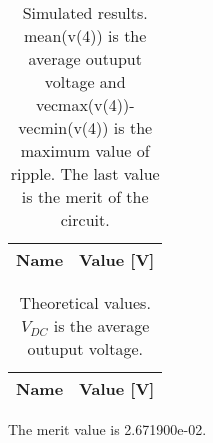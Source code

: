 \begin{table}[h]
  \centering
  \begin{tabular}{|l|r|}
    \hline    
    {\bf Name} & {\bf Value [V]} \\ \hline
    
  \end{tabular}
  \caption{Simulated results. mean(v(4)) is the average outuput voltage and vecmax(v(4))-vecmin(v(4)) is the maximum value of ripple. The last value is the merit of the circuit.}
  
  \label{tab:sim}
\end{table}

\begin{table}[h]
  \centering
  \begin{tabular}{|l|r|}
    \hline    
    {\bf Name} & {\bf Value [V]} \\ \hline
    
  \end{tabular}
  \caption{Theoretical values. $V_{DC}$ is the average outuput voltage.}
  \label{tab:tab1}
\end{table}


The merit value is 2.671900e-02.







